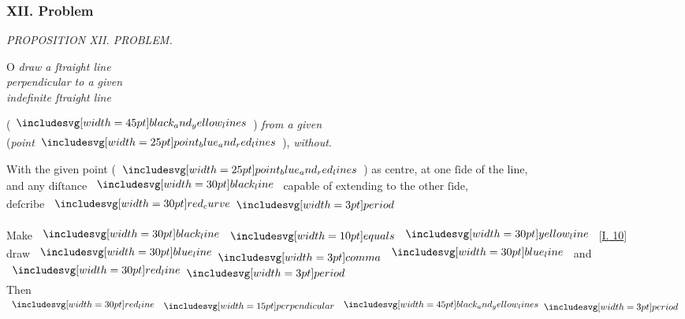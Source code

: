 \documentclass[11pt,preview]{standalone}
\begin{document}
\subsubsection{XII. Problem}

\begin{minipage}[t]{0.43\textwidth}
    \vspace{20pt}
    
\end{minipage}%
\hfill
\begin{minipage}[t]{0.55\textwidth}
    \begin{center}
        \textit{PROPOSITION XII. PROBLEM.}\label{book1pr12} \\
    \end{center}

    \hfill

    \begin{center}
        \raggedright \lettrine[lines=3, loversize=1, nindent=0pt]{}{}O \textit{draw a ſtraight line\\ perpendicular to a given\\ indefinite ſtraight line}
    \end{center}
    (\hspace{-1ex}$\bimg{black_and_yellow_lines}$\hspace{-1ex}) \textit{from a given}\\ (\textit{point}$\img{point_blue_and_red_lines}$\hspace{-1ex}), \textit{without}.
\end{minipage}

\hfill

\begin{center}
    With the given point (\hspace{-1ex}$\img{point_blue_and_red_lines}$\hspace{-1ex}) as centre, at one ſide of the line,\\
    and any diſtance $\blackline$ capable of extending to the other ſide,\\ deſcribe $\img[0][0][30]{red_curve} \bperiod$\\
    \hfill\\
    Make $\blackline \bequals \yellowline$ [\hyperref[book1pr10]{\textsc{I.} 10}]\\
    draw $\blueline \bcomma \blueline$ and $\redline \bperiod$\\
    Then $\redline \bperp \bimg{black_and_yellow_lines} \bperiod$
\end{center}
\end{document}
